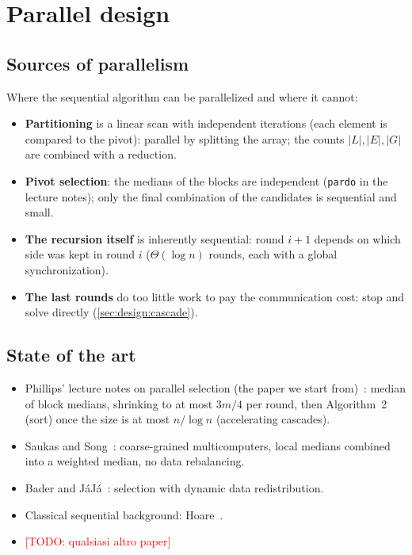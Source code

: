 \documentclass[11pt, titlepage]{article}
\newcommand{\TODO}[1]{\textcolor{red}{[TODO: #1]}}
\begin{document}
\section{Parallel design}\label{sec:design}

\subsection{Sources of parallelism}
Where the sequential algorithm can be parallelized and where it cannot:
\begin{itemize}
\item \textbf{Partitioning} is a linear scan with independent iterations (each element is compared to the pivot): parallel by splitting the array; the counts $|L|,|E|,|G|$ are combined with a reduction.
\item \textbf{Pivot selection}: the medians of the blocks are independent (\texttt{pardo} in the lecture notes); only the final combination of the candidates is sequential and small.
\item \textbf{The recursion itself} is inherently sequential: round $i+1$ depends on which side was kept in round $i$ ($\Theta(\log n)$ rounds, each with a global synchronization).
\item \textbf{The last rounds} do too little work to pay the communication cost: stop and solve directly (\cref{sec:design:cascade}).
\end{itemize}

\subsection{State of the art}\label{sec:design:sota}
\begin{itemize}
\item Phillips' lecture notes on parallel selection (the paper we start from)~\cite{phillips}: median of block medians, shrinking to at most $3m/4$ per round, then Algorithm~2 (sort) once the size is at most $n/\log n$ (accelerating cascades).
\item Saukas and Song~\cite{saukas}: coarse-grained multicomputers, local medians combined into a weighted median, no data rebalancing.
\item Bader and J\'aJ\'a~\cite{bader}: selection with dynamic data redistribution.
\item Classical sequential background: Hoare~\cite{hoare}.
\item \TODO{qualsiasi altro paper}
\end{itemize}
\end{document}
